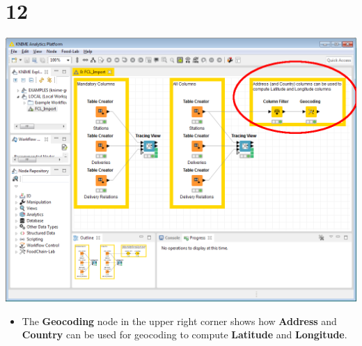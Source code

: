 \documentclass{beamer}
\begin{document}
\section{12}
\begin{frame}
	\begin{center}
  		\includegraphics[height=0.6\textheight]{12.png}
	\end{center}
	\begin{itemize}
		\item The \textbf{Geocoding} node in the upper right corner shows how \textbf{Address} and \textbf{Country} can be used for geocoding to compute \textbf{Latitude} and \textbf{Longitude}.
	\end{itemize}
\end{frame}
\end{document}
